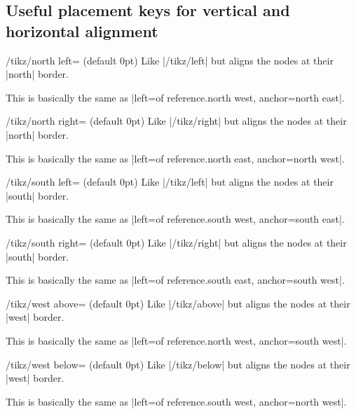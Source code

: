 \subsection{Useful placement keys for vertical and horizontal alignment}
\begin{stylekey}{/tikz/north left= (default 0pt)}
  Like |/tikz/left| but aligns the nodes at their |north| border.
  
  This is basically the same as |left=of reference.north west, anchor=north east|.
\begin{codeexample}[preamble=\usetikzlibrary{ext.positioning-plus}]
\end{codeexample}
\end{stylekey}
\begin{stylekey}{/tikz/north right= (default 0pt)}
  Like |/tikz/right| but aligns the nodes at their |north| border.
  
  This is basically the same as |left=of reference.north east, anchor=north west|.
\end{stylekey}
\begin{stylekey}{/tikz/south left= (default 0pt)}
  Like |/tikz/left| but aligns the nodes at their |south| border.
  
  This is basically the same as |left=of reference.south west, anchor=south east|.
\end{stylekey}
\begin{stylekey}{/tikz/south right= (default 0pt)}
  Like |/tikz/right| but aligns the nodes at their |south| border.
  
  This is basically the same as |left=of reference.south east, anchor=south west|.
\end{stylekey}
\begin{stylekey}{/tikz/west above= (default 0pt)}
  Like |/tikz/above| but aligns the nodes at their |west| border.
  
  This is basically the same as |left=of reference.north west, anchor=south west|.
\end{stylekey}
\begin{stylekey}{/tikz/west below= (default 0pt)}
  Like |/tikz/below| but aligns the nodes at their |west| border.
  
  This is basically the same as |left=of reference.south west, anchor=north west|.
\end{stylekey}
